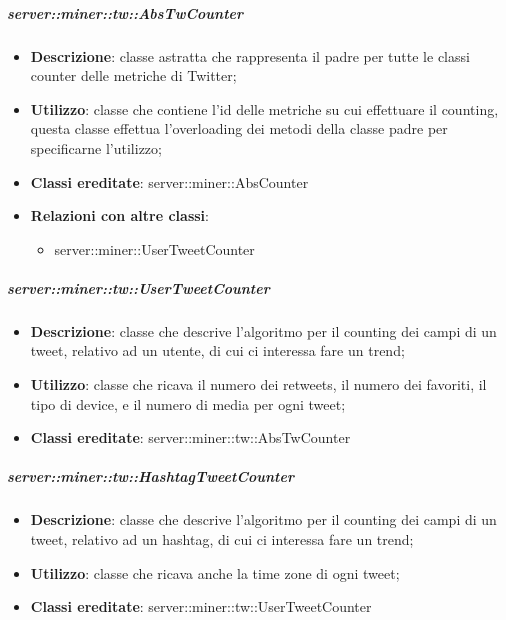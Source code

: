 	\subparagraph{server::miner::tw::AbsTwCounter} %
		\label{subp:server_miner_tw_AbsTwCounter}
			\begin{itemize}
				\item \textbf{Descrizione}: classe astratta che rappresenta il padre per tutte le classi counter delle metriche di Twitter;
				\item \textbf{Utilizzo}: classe che contiene l’id delle metriche su cui effettuare il counting, questa classe effettua l'overloading dei metodi della classe padre per specificarne l’utilizzo;
				\item \textbf{Classi ereditate}: server::miner::AbsCounter
				\item \textbf{Relazioni con altre classi}:
					\begin{itemize}
						\item server::miner::UserTweetCounter
					\end{itemize}
			\end{itemize}

	\subparagraph{server::miner::tw::UserTweetCounter} %
		\label{subp:server_miner_tw_UserTweetCounter}
			\begin{itemize}
				\item \textbf{Descrizione}: classe che descrive l'algoritmo per il counting dei campi di un tweet, relativo ad un utente, di cui ci interessa fare un trend;
				\item \textbf{Utilizzo}: classe che ricava il numero dei retweets, il numero dei favoriti, il tipo di device, e il numero di media per ogni tweet;
				\item \textbf{Classi ereditate}: server::miner::tw::AbsTwCounter
			\end{itemize}


	\subparagraph{server::miner::tw::HashtagTweetCounter} %
		\label{subp:server_miner_tw_HashtagTweetCounter}
			\begin{itemize}
				\item \textbf{Descrizione}: classe che descrive l'algoritmo per il counting dei campi di un tweet, relativo ad un hashtag, di cui ci interessa fare un trend;
				\item \textbf{Utilizzo}: classe che ricava anche la time zone di ogni tweet;
				\item \textbf{Classi ereditate}: server::miner::tw::UserTweetCounter
			\end{itemize}

